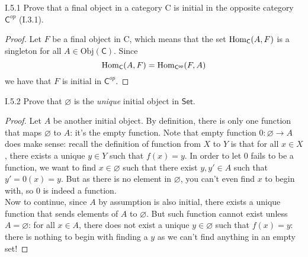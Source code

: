 \section{}

\begin{problem}{I.5.1}
Prove that a final object in a category \textsf{C} is initial in the opposite category $\mathsf{C}^{op}$ (I.3.1).	
\end{problem}
\begin{proof}
Let $F$ be a final object in \textsf{C}, which means that the set $\operatorname{Hom}_\mathsf{C}(A, F)$ is a singleton for all $A \in \text{Obj}(\mathsf{C})$. Since
\[
\operatorname{Hom}_\mathsf{C}(A, F) = \operatorname{Hom}_\mathsf{C^{op}}(F, A)
\]
we have that $F$ is initial in $\mathsf{C}^{op}$.
\end{proof}


\begin{problem}{I.5.2}
Prove that $\varnothing$ is the \emph{unique} initial object in $\mathsf{Set}$.
\end{problem}
\begin{proof}
Let $A$ be another initial object. By definition, there is only one function that maps $\varnothing$ to $A$: it's the empty function. Note that empty function $0: \varnothing \to A$ does make sense: recall the definition of function from $X$ to $Y$ is that for all $x \in X$, there exists a unique $y \in Y$ such that $f(x) = y$. In order to let $0$ fails to be a function, we want to find $x \in \varnothing$ such that there exist $y,y' \in A$ such that $y' = 0(x) = y$. But as there is no element in $\varnothing$, you can't even find $x$ to begin with, so $0$ is indeed a function. \\
Now to continue, since $A$ by assumption is also initial, there exists a unique function that sends elements of $A$ to $\varnothing$. But such function cannot exist unless $A = \varnothing$: for all $x \in A$, there does not exist a unique $y \in \varnothing$ such that $f(x) = y$: there is nothing to begin with finding a $y$ as we can't find anything in an empty set! 
\end{proof}

